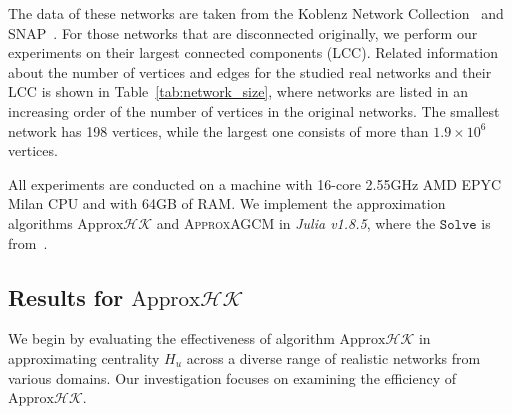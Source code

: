 \documentclass[journal]{IEEEtran}
\begin{document}
The data of these networks are taken from the Koblenz Network Collection~\cite{Ku13} and SNAP~\cite{LeKr14}. For those networks that are disconnected originally, we perform our experiments on their largest connected components (LCC). Related information about the number of vertices and edges for the studied real networks and their LCC is shown  in Table~\ref{tab:network_size},  where networks are listed in an increasing order of the number of vertices in the original networks. The smallest network has 198 vertices, while the largest one consists of more than \(1.9 \times 10^{6}\) vertices.

All experiments are conducted on a machine with 16-core 2.55GHz AMD EPYC Milan CPU and with 64GB of RAM. We implement the approximation algorithms \(\text{Approx}\mathcal{HK}\) and \textsc{ApproxAGCM} in \textit{Julia v1.8.5}, where the \(\mathtt{Solve}\) is from~\cite{GaKySp23}. %

\subsection{Results for \(\text{Approx}\mathcal{HK}\)}

We begin by evaluating the effectiveness of algorithm \(\text{Approx}\mathcal{HK}\) in approximating centrality \(H_u\) across a diverse range of realistic networks from various domains. Our investigation focuses on examining the efficiency of \(\text{Approx}\mathcal{HK}\).
\end{document}
